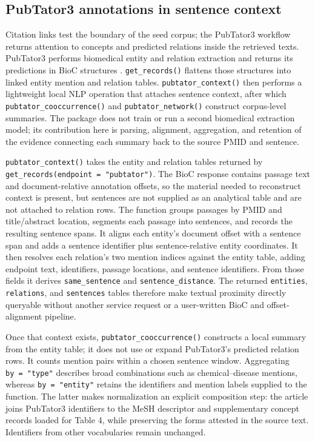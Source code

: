 \subsection{PubTator3 annotations in sentence context}\label{pubtator3-annotations-in-sentence-context}

Citation links test the boundary of the seed corpus; the PubTator3 workflow
returns attention to concepts and predicted relations inside the retrieved
texts. PubTator3 performs biomedical entity and relation extraction and returns
its predictions in BioC structures \citep{wei2024pubtator}. \texttt{get\_records()} flattens
those structures into linked entity mention and relation tables.
\texttt{pubtator\_context()} then performs a lightweight local NLP operation that
attaches sentence context, after which \texttt{pubtator\_cooccurrence()} and
\texttt{pubtator\_network()} construct corpus-level summaries. The package does not
train or run a second biomedical extraction model; its contribution here is
parsing, alignment, aggregation, and retention of the evidence connecting each
summary back to the source PMID and sentence.

\texttt{pubtator\_context()} takes the entity and relation tables returned by
\texttt{get\_records(endpoint\ =\ "pubtator")}. The BioC response contains passage text
and document-relative annotation offsets, so the material needed to reconstruct
context is present, but sentences are not supplied as an analytical table and
are not attached to relation rows. The function groups passages by PMID and
title/abstract location, segments each passage into sentences, and records the
resulting sentence spans. It aligns each entity's document offset with a
sentence span and adds a sentence identifier plus sentence-relative entity
coordinates. It then resolves each relation's two mention indices against the
entity table, adding endpoint text, identifiers, passage locations, and sentence
identifiers. From those fields it derives \texttt{same\_sentence} and
\texttt{sentence\_distance}. The returned \texttt{entities}, \texttt{relations}, and \texttt{sentences}
tables therefore make textual proximity directly queryable without another
service request or a user-written BioC and offset-alignment pipeline.

Once that context exists, \texttt{pubtator\_cooccurrence()} constructs a local summary
from the entity table; it does not use or expand PubTator3's predicted relation
rows. It counts mention pairs within a chosen sentence window. Aggregating
\texttt{by\ =\ "type"} describes broad combinations such as chemical--disease mentions,
whereas \texttt{by\ =\ "entity"} retains the identifiers and mention labels supplied to
the function. The latter makes normalization an explicit composition step: the
article joins PubTator3 identifiers to the MeSH descriptor and supplementary
concept records loaded for Table 4, while preserving the forms attested in the
source text. Identifiers from other vocabularies remain unchanged.

